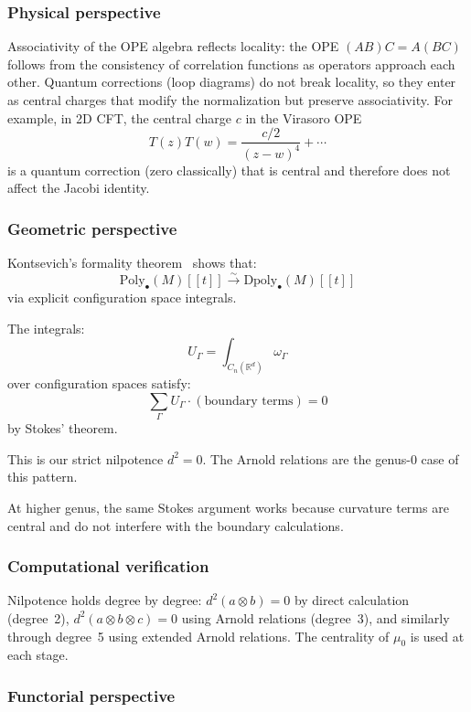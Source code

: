 \subsubsection{Physical perspective}

Associativity of the OPE algebra reflects locality: the OPE $(AB)C = A(BC)$ follows from the consistency of correlation functions as operators approach each other. Quantum corrections (loop diagrams) do not break locality, so they enter as central charges that modify the normalization but preserve associativity. For example, in 2D CFT, the central charge $c$ in the Virasoro OPE
\[T(z)T(w) = \frac{c/2}{(z-w)^4} + \cdots\]
is a quantum correction (zero classically) that is central and therefore does not affect the Jacobi identity.

\subsubsection{Geometric perspective}

Kontsevich's formality theorem~\cite{Kon03} shows that:
\[\text{Poly}_{\bullet}(M)[[t]] \xrightarrow{\sim} \text{Dpoly}_{\bullet}(M)[[t]]\]
via explicit configuration space integrals.

The integrals:
\[U_\Gamma = \int_{C_n(\mathbb{R}^d)} \omega_\Gamma\]
over configuration spaces satisfy:
\[\sum_\Gamma U_\Gamma \cdot (\text{boundary terms}) = 0\]
by Stokes' theorem.

This is our strict nilpotence $d^2 = 0$. The Arnold relations are the
genus-0 case of this pattern.

At higher genus, the same Stokes argument works because curvature terms are central and do not
interfere with the boundary calculations.

\subsubsection{Computational verification}

Nilpotence holds degree by degree: $d^2(a \otimes b) = 0$ by direct calculation (degree~2), $d^2(a \otimes b \otimes c) = 0$ using Arnold relations (degree~3), and similarly through degree~5 using extended Arnold relations.  The centrality of $\mu_0$ is used at each stage.

\subsubsection{Functorial perspective}

